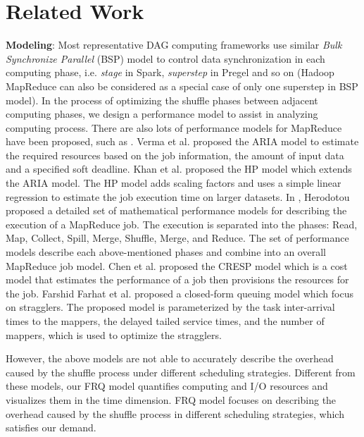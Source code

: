 \section{Related Work}

{\color{blue}
\textbf{Modeling}: Most representative DAG computing frameworks use similar \textit{Bulk Synchronize Parallel} (BSP)\cite{valiant1990bridging} model to control data synchronization in each computing phase, i.e. \textit{stage} in Spark, \textit{superstep} in Pregel\cite{malewicz2010pregel} and so on (Hadoop MapReduce can also be considered as a special case of only one superstep in BSP model). 
In the process of optimizing the shuffle phases between adjacent computing phases, we design a performance model to assist in analyzing computing process.
There are also lots of performance models for MapReduce have been proposed, such as \cite{verma2011aria, khan2016hadoop, herodotou2011hadoop, chen2014cresp, farhat2016stochastic}.
Verma et al. \cite{verma2011aria} proposed the ARIA model to estimate the required resources based on the job information, the amount of input data and a specified soft deadline.
Khan et al. \cite{khan2016hadoop} proposed the HP model which extends the ARIA model. The HP model adds scaling factors and uses a simple linear regression to estimate the job execution time on larger datasets.
In \cite{herodotou2011hadoop}, Herodotou proposed a detailed set of mathematical performance models for describing the execution of a MapReduce job. The execution is separated into the phases: Read, Map, Collect, Spill, Merge, Shuffle, Merge, and Reduce. The set of performance models describe each above-mentioned phases and combine into an overall MapReduce job model. 
Chen et al. \cite{chen2014cresp} proposed the CRESP model which is a cost model that estimates the performance of a job then 
provisions the resources for the job.
Farshid Farhat et al.\cite{farhat2016stochastic} proposed a closed-form queuing model which focus on stragglers. The proposed model is parameterized by the task inter-arrival times to the mappers, the delayed tailed service times, and the number of mappers, which is used to optimize the stragglers.


However, the above models are not able to accurately describe the overhead caused by the shuffle process under different scheduling strategies. 
Different from these models, our FRQ model quantifies computing and I/O resources and visualizes them in the time dimension. FRQ model focuses on describing the overhead caused by the shuffle process in different scheduling strategies, which satisfies our demand.
}


